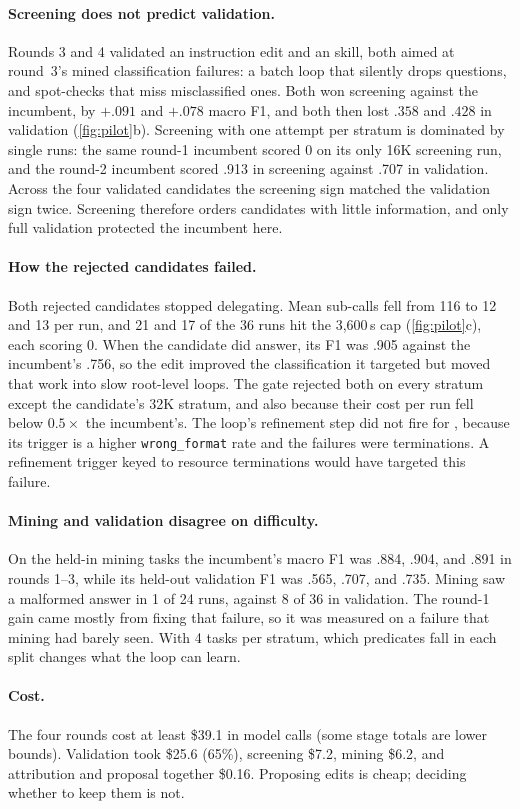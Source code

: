 \paragraph{Screening does not predict validation.}
Rounds 3 and 4 validated an  instruction edit and an  skill,
both aimed at round~3's mined classification failures: a batch loop that
silently drops questions, and spot-checks that miss misclassified ones. Both
won screening against the incumbent, by $+.091$ and $+.078$ macro F1, and both
then lost $.358$ and $.428$ in validation (\cref{fig:pilot}b). Screening with
one attempt per stratum is dominated by single runs: the same round-1
incumbent scored 0 on its only 16K screening run, and the round-2 incumbent
scored .913 in screening against .707 in validation. Across the four validated
candidates the screening sign matched the validation sign twice. Screening
therefore orders candidates with little information, and only full validation
protected the incumbent here.

\paragraph{How the rejected candidates failed.}
Both rejected candidates stopped delegating. Mean sub-calls fell from 116 to
12 and 13 per run, and 21 and 17 of the 36 runs hit the 3,600\,s cap
(\cref{fig:pilot}c), each scoring 0. When the  candidate did answer,
its F1 was .905 against the incumbent's .756, so the edit improved the
classification it targeted but moved that work into slow root-level loops.
The gate rejected both on every stratum except the  candidate's 32K
stratum, and also because their cost per run fell below $0.5\times$ the
incumbent's. The loop's refinement step did not fire for , because its
trigger is a higher \texttt{wrong\_format} rate and the failures were
terminations. A refinement trigger keyed to resource terminations would have
targeted this failure.

\paragraph{Mining and validation disagree on difficulty.}
On the held-in mining tasks the incumbent's macro F1 was .884, .904, and .891
in rounds 1--3, while its held-out validation F1 was .565, .707, and .735.
Mining saw a malformed answer in 1 of 24 \hzero runs, against 8 of 36 in
validation. The round-1 gain came mostly from fixing that failure, so it was
measured on a failure that mining had barely seen. With 4 tasks per stratum,
which predicates fall in each split changes what the loop can learn.

\paragraph{Cost.}
The four rounds cost at least \$39.1 in model calls (some stage totals are
lower bounds). Validation took \$25.6 (65\%), screening \$7.2, mining \$6.2,
and attribution and proposal together \$0.16. Proposing edits is cheap;
deciding whether to keep them is not.
